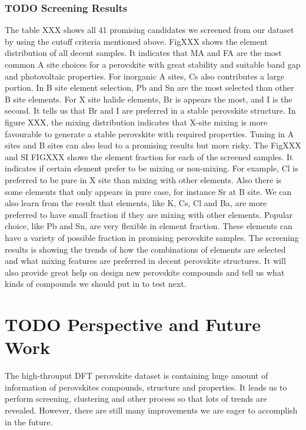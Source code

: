 \documentclass[twoside, twocolumn, 9pt, draft]{article}
\begin{document}
\subsubsection*{{\bfseries\sffamily TODO} Screening Results}
\label{sec:orgc2120ba}
The table XXX shows all 41 promising candidates we screened from our dataset by using the cutoff criteria mentioned above. FigXXX shows the element distribution of all decent samples. It indicates that MA and FA are the most common A site choices for a perovskite with great stability and suitable band gap and photovoltaic properties. For inorganic A sites, Cs also contributes a large portion. In B site element selection, Pb and Sn are the most selected than other B site elements. For X site halide elements, Br is appears the most, and I is the second. It tells us that Br and I are preferred in a stable perovskite structure. In figure XXX, the mixing distribution indicates that X-site mixing is more favourable to generate a stable perovskite with required properties. Tuning in A sites and B sites can also lead to a promising results but more risky. 
The FigXXX and SI FIGXXX shows the element fraction for each of the screened samples. It indicates if certain element prefer to be mixing or non-mixing. For example, Cl is preferred to be pure in X site than mixing with other elements. Also there is some elements that only appears in pure case, for instance Sr at B site. We can also learn from the result that elements, like K, Cs, Cl and Ba, are more preferred to have small fraction if they are mixing with other elements. Popular choice, like Pb and Sn, are very flexible in element fraction. These elements can have a variety of possible fraction in promising perovskite samples.
The screening results is showing the trends of how the combinations of elements are selected and what mixing features are preferred in decent perovskite structures. It will also provide great help on design new perovskite compounds and tell us what kinds of compounds we should put in to test next.

\section*{{\bfseries\sffamily TODO} Perspective and Future Work}
\label{sec:org59fdda8}
The high-throuput DFT perovskite dataset is containing huge amount of information of perovskites compounds, structure and properties. It leads us to perform screening, clustering and other process so that lots of trends are revealed. However, there are still many improvements we are eager to accomplish in the future.
\end{document}
